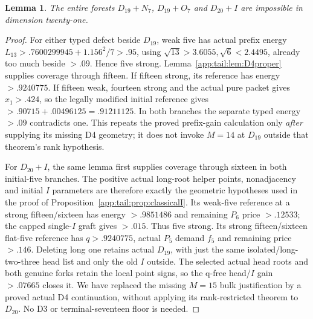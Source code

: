 \documentclass[11pt]{article}
\newtheorem{lemma}[theorem]{Lemma}
\theoremstyle{definition}
\theoremstyle{remark}
\begin{document}
\begin{lemma}
\label{app:tail:lem:proper21}
The entire forests $D_{19}+N_7$, $D_{19}+O_7$ and $D_{20}+I$
are impossible in dimension twenty-one.
\end{lemma}
\begin{proof}
For either typed defect beside $D_{19}$, weak five has actual
prefix energy
$L_{13}>.7600299945+1.156^2/7>.95$, using
$\sqrt{13}>3.6055,\sqrt6<2.4495$, already too much beside $>.09$.
Hence five strong. Lemma~\ref{app:tail:lem:D4proper} supplies
coverage through fifteen. If fifteen strong, its reference has
energy $>.9240775$. If fifteen weak, fourteen strong and the
actual pure packet gives $x_1>.424$, so the legally modified
initial reference gives $>.90715+.00496125=.91211125$.
In both branches the separate typed energy $>.09$ contradicts one.
This repeats the proved prefix-gain calculation only \emph{after}
supplying its missing D4 geometry; it does not invoke $M=14$
at $D_{19}$ outside that theorem's rank hypothesis.

For $D_{20}+I$, the same lemma first supplies coverage through
sixteen in both initial-five branches. The positive actual long-root
helper points, nonadjacency and initial $I$ parameters are therefore
exactly the geometric hypotheses used in the proof of
Proposition~\ref{app:tail:prop:classicalI}. Its weak-five reference
at a strong fifteen/sixteen has energy $>.9851486$ and remaining
$P_6$ price $>.12533$; the capped single-$I$ graft gives $>.015$.
Thus five strong. Its strong fifteen/sixteen flat-five reference
has $q>.9240775$, actual $P_5$ demand $f_5$ and remaining price
$>.146$. Deleting long one retains actual $D_{19}$, with just the
same isolated/long-two-three head list and only the old $I$ outside.
The selected actual head roots and both genuine forks retain the
local point signs, so the q-free head/$I$ gain $>.07665$ closes it.
We have replaced the missing $M=15$ bulk justification by a proved
actual D4 continuation, without applying its rank-restricted theorem
to $D_{20}$. No D3 or terminal-seventeen floor is needed.
\end{proof}
\end{document}
